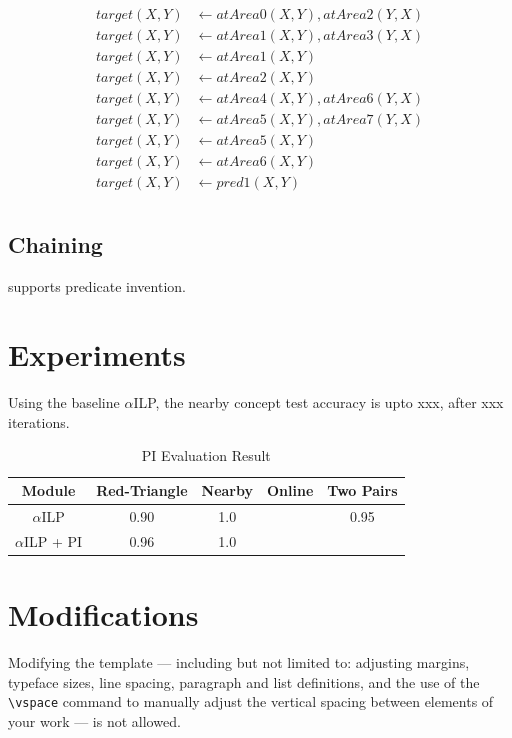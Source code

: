 \documentclass[
]{ceurart}
\begin{document}
\begin{align*}
	target(X,Y) &\leftarrow atArea0(X,Y), atArea2(Y,X)  \\
	target(X,Y) &\leftarrow atArea1(X,Y),atArea3(Y,X) \\
	target(X,Y) &\leftarrow atArea1(X,Y) \\    
	target(X,Y) &\leftarrow atArea2(X,Y) \\    
	target(X,Y) &\leftarrow atArea4(X,Y),atArea6(Y,X) \\
	target(X,Y) &\leftarrow atArea5(X,Y),atArea7(Y,X) \\
	target(X,Y) &\leftarrow atArea5(X,Y) \\    
	target(X,Y) &\leftarrow atArea6(X,Y) \\
	target(X,Y) &\leftarrow pred1(X,Y) \\
\end{align*}




\subsection{Chaining}
\cite{dILP} supports predicate invention.


\section{Experiments}

Using the baseline $\alpha$ILP, the nearby concept test accuracy is upto xxx, after xxx iterations.
\begin{table}
	\caption{PI Evaluation Result}
	\label{tab:nearby-pi-result}
	\begin{tabular}{ccccc}
		\toprule
		Module & Red-Triangle & Nearby & Online & Two Pairs\\
		\midrule
		$\alpha$ILP 		&      0.90 	& 	1.0	& 		& 0.95 \\
		$\alpha$ILP + PI &  	0.96 	& 	1.0	& 		& \\
		\bottomrule
	\end{tabular}
\end{table}


\section{Modifications}

Modifying the template --- including but not limited to: adjusting
margins, typeface sizes, line spacing, paragraph and list definitions,
and the use of the \verb|\vspace| command to manually adjust the
vertical spacing between elements of your work --- is not allowed.
\end{document}
